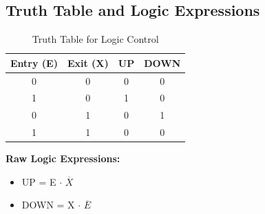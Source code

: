 \documentclass[a4paper,12pt]{article}
\begin{document}
\subsection{Truth Table and Logic Expressions}
\begin{table}[h!]
\centering
\begin{tabular}{|c|c|c|c|}
\hline
\textbf{Entry (E)} & \textbf{Exit (X)} & \textbf{UP} & \textbf{DOWN} \\
\hline
0 & 0 & 0 & 0 \\
1 & 0 & 1 & 0 \\
0 & 1 & 0 & 1 \\
1 & 1 & 0 & 0 \\
\hline
\end{tabular}
\caption{Truth Table for Logic Control}
\end{table}

\textbf{Raw Logic Expressions:}
\begin{itemize}
  \item UP = E \(\cdot\) \(\overline{X}\)
  \item DOWN = X \(\cdot\) \(\overline{E}\)
\end{itemize}
\end{document}
